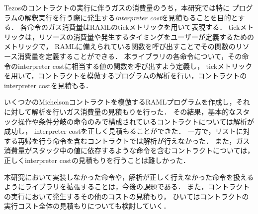\documentclass{kuisthesis}
\begin{document}
\begin{jabstract}
Tezosのコントラクトの実行に伴うガスの消費量のうち，本研究では特に
プログラムの解釈実行を行う際に発生する\emph{interpreter cost}を見積もることを目的とする．
各命令のガス消費量はRAMLのtickメトリックを用いて表現する．
tickメトリックは，リソースの消費量や発生するタイミングをユーザーが定義するためのメトリックで，
RAMLに備えられている関数を呼び出すことでその関数のリソース消費量を定義することができる．
本ライブラリの各命令について，その命令のinterpreter costに相当する値の関数を呼び出すよう定義し，
tickメトリックを用いて，コントラクトを模倣するプログラムの解析を行い，コントラクトのinterpreter costを見積もる．

いくつかのMichelsonコントラクトを模倣するRAMLプログラムを作成し，それに対して解析を行いガス消費量の見積もりを行った．
その結果，基本的なスタック操作や条件分岐の命令のみで構成されているコントラクトについては解析が成功し，
interpreter costを正しく見積もることができた．
一方で，リストに対する再帰を行う命令を含むコントラクトでは解析が行えなかった．
また，ガス消費量がスタック中の値に依存するような命令を含むコントラクトについては，
正しくinterpreter costの見積もりを行うことは難しかった．

本研究において実装しなかった命令や，解析が正しく行えなかった命令を扱えるようにライブラリを拡張することは，今後の課題である．
また，コントラクトの実行において発生するその他のコストの見積もり，
ひいてはコントラクトの実行コスト全体の見積もりについても検討していく．


\end{jabstract}
\end{document}
